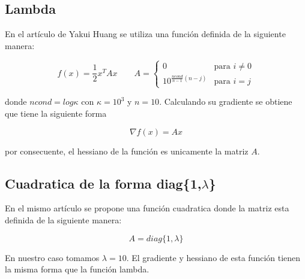 \subsection*{Lambda}

En el artículo de Yakui Huang\cite{huang_2022_1} se utiliza una función definida de la siguiente manera:

\begin{equation*}
    f(x) = \frac{1}{2}x^TAx \qquad A=\begin{cases}
        0                           & \text{para } i\neq 0 \\
        10^{\frac{ncond}{n-1}(n-j)} & \text{para } i=j
    \end{cases}
\end{equation*}

donde $ncond=log \kappa$ con $\kappa = 10^3$ y $n=10$. Calculando su gradiente se obtiene que tiene la siguiente forma

\begin{equation*}
    \nabla f(x) = Ax
\end{equation*}

por consecuente, el hessiano de la función es unicamente la matriz $A$.

\subsection*{Cuadratica de la forma diag\{1,$\lambda$\}}

En el mismo artículo\cite{huang_2022_1} se propone una función cuadratica donde la matriz esta definida de la siguiente manera:

\begin{equation*}
    A = diag\{1,\lambda\}
\end{equation*}

En nuestro caso tomamos $\lambda=10$. El gradiente y hessiano de esta función tienen la misma forma que la función lambda.





